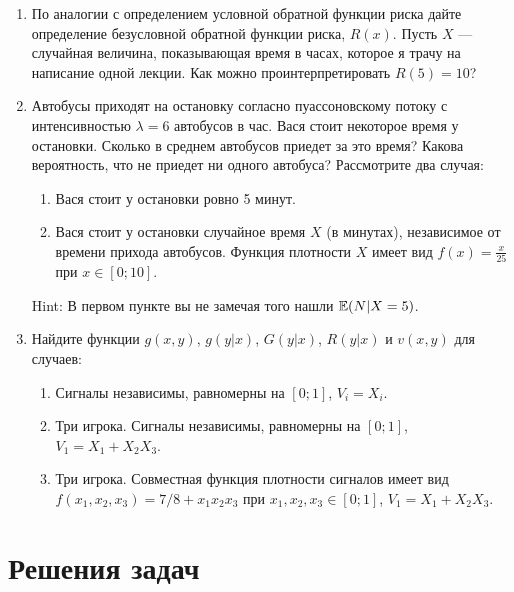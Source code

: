 \begin{enumerate}
\item По аналогии с определением условной обратной функции риска дайте определение безусловной обратной функции риска, $ R(x) $. Пусть $ X $ --- случайная величина, показывающая время в часах, которое я трачу на написание одной лекции. Как можно проинтерпретировать $ R(5)=10 $?
\item Автобусы приходят на остановку согласно пуассоновскому потоку с интенсивностью $ \lambda=6 $ автобусов в час. Вася стоит некоторое время у остановки. Сколько в среднем автобусов приедет за это время? Какова вероятность, что не приедет ни одного автобуса? Рассмотрите два случая:
\begin{enumerate}
\item Вася стоит у остановки ровно 5 минут. 
\item Вася стоит у остановки случайное время $ X $ (в минутах), независимое от времени прихода автобусов. Функция плотности $ X $ имеет вид $ f(x)= \frac{x}{25}$ при $ x\in [0;10] $.
\end{enumerate}
Hint: В первом пункте вы не замечая того нашли $ \mathbb{E}(N|X=5) $.
\item Найдите функции $ g(x,y)$, $ g(y|x)$, $ G(y|x)$,  $R(y|x)$ и $v(x,y)$ для случаев:
\label{ex_vxy}
\begin{enumerate}
\item Сигналы независимы, равномерны на $ [0;1] $, $ V_{i}=X_{i} $.
\item Три игрока. Сигналы независимы, равномерны на $ [0;1] $, $ V_{1}=X_{1}+X_{2}X_{3} $.
\item Три игрока. Совместная функция плотности сигналов имеет вид $ f(x_{1},x_{2},x_{3})=7/8+x_{1}x_{2}x_{3} $ при $ x_{1},x_{2},x_{3}\in[0;1] $, $ V_{1}=X_{1}+X_{2}X_{3} $.
\end{enumerate}
\end{enumerate}


\section{Решения задач}

